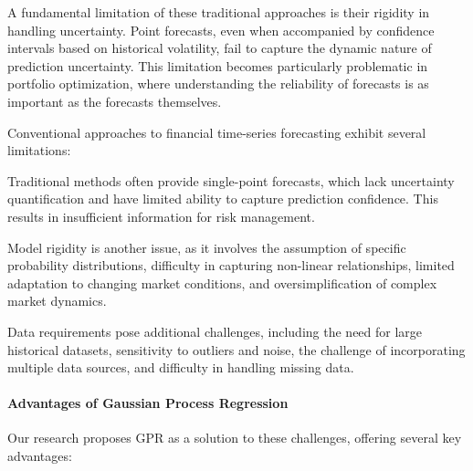 A fundamental limitation of these traditional approaches is their rigidity in handling uncertainty. Point forecasts, even when accompanied by confidence intervals based on historical volatility, fail to capture the dynamic nature of prediction uncertainty. This limitation becomes particularly problematic in portfolio optimization, where understanding the reliability of forecasts is as important as the forecasts themselves.

Conventional approaches to financial time-series forecasting exhibit several limitations:

Traditional methods often provide single-point forecasts, which lack uncertainty quantification and have limited ability to capture prediction confidence. This results in insufficient information for risk management.

Model rigidity is another issue, as it involves the assumption of specific probability distributions, difficulty in capturing non-linear relationships, limited adaptation to changing market conditions, and oversimplification of complex market dynamics.

Data requirements pose additional challenges, including the need for large historical datasets, sensitivity to outliers and noise, the challenge of incorporating multiple data sources, and difficulty in handling missing data.

\paragraph{Advantages of Gaussian Process Regression}
Our research proposes \ac{GPR} as a solution to these challenges, offering several key advantages:

